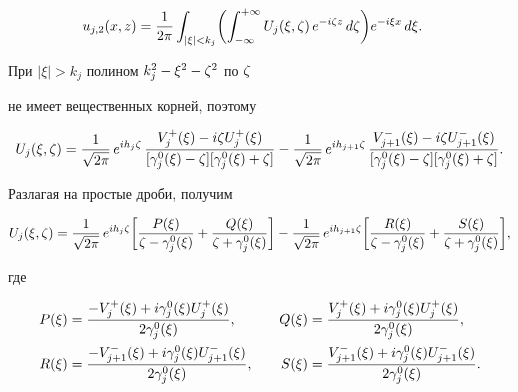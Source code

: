 \begin{pf}
\begin{align*}
%


u_{j,2}(x,z) &=


\frac{1}{2\pi}\int_{|\xi|<k_j}


\biggl( \int_{-\infty}^{+\infty} U_j(\xi,\dz)\,e^{-i\dz z}\, d\dz


\biggr) e^{-i\xi x}\,d\xi .


\end{align*}





При $|\xi|>k_j$ полином $k_j^2-\xi^2-\zeta^2$ по $\zeta$


не имеет вещественных корней, поэтому


$$


U_j(\xi,\dz) = \frac{1}{\sqrt{2\pi}}\,e^{ih_j\dz}\,


\frac{V^+_j(\xi)-i\dz U^+_j(\xi)}{[\gaoxi{j}-\dz][\gaoxi{j}+\dz]}


- \frac{1}{\sqrt{2\pi}}\,e^{ih_{j+1}\dz}\,


\frac{V^-_{j+1}(\xi)-i\dz U^-_{j+1}(\xi)}{[\gaoxi{j}-\dz][\gaoxi{j}+\dz]} .


$$


Разлагая на простые дроби, получим


$$


U_j(\xi,\dz) = \frac{1}{\sqrt{2\pi}}\,e^{ih_j\dz} \biggl[


\frac{P(\xi)}{\dz-\gaoxi{j}} + \frac{Q(\xi)}{\dz+\gaoxi{j}}


\biggr]


- \frac{1}{\sqrt{2\pi}}\,e^{ih_{j+1}\dz} \biggl[


\frac{R(\xi)}{\dz-\gaoxi{j}}


+ \frac{S(\xi)}{\dz+\gaoxi{j}}\biggr] ,


$$


где


\begin{alignat*}{2}


P(\xi) &= \frac{-V^+_j(\xi)+i\gaoxi{j}U^+_j(\xi)}{2\gaoxi{j}},&\quad


Q(\xi) &= \frac{V^+_j(\xi)+i\gaoxi{j}U^+_j(\xi)}{2\gaoxi{j}} , \\


%


R(\xi) &= \frac{-V^-_{j+1}(\xi)+i\gaoxi{j}U^-_{j+1}(\xi)}{2\gaoxi{j}},&\quad


S(\xi) &= \frac{V^-_{j+1}(\xi)+i\gaoxi{j}U^-_{j+1}(\xi)}{2\gaoxi{j}} .


\end{alignat*}



\end{pf}
